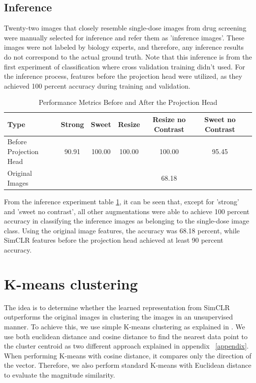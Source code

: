 \subsection{Inference}\label{subsec:inference}

Twenty-two images that closely resemble single-dose images from drug screening were manually selected for inference and refer them as 'inference images'. These images were not labeled by biology experts, and therefore, any inference results do not correspond to the actual ground truth. Note that this inference is from the first experiment of classification where cross validation training didn't used. For the inference process, features before the projection head were utilized, as they achieved 100 percent accuracy during training and validation.
\begin{table}[H]
    \centering
    \begin{tabular}{@{}lcccccc@{}}
    \toprule
    \textbf{Type} & \textbf{Strong} & \textbf{Sweet} & \textbf{Resize} & \textbf{Resize no Contrast} & \textbf{Sweet no Contrast} \\ \midrule
    Before Projection Head & 90.91 & 100.00 & 100.00 & 100.00 & 95.45 \\ \midrule
    Original Images & & & & 68.18 & \\ \bottomrule
    \end{tabular}
    \caption{Performance Metrics Before and After the Projection Head}
    \label{tab:performance_metrics}
\end{table}

From the inference experiment table \ref{tab:performance_metrics}, it can be seen that, except for 'strong' and 'sweet no contrast', all other augmentations were able to achieve 100 percent accuracy in classifying the inference images as belonging to the single-dose image class. Using the original image features, the accuracy was 68.18 percent, while SimCLR features before the projection head achieved at least 90 percent accuracy. 
\section{K-means clustering}

The idea is to determine whether the learned representation from SimCLR outperforms the original images in clustering the images in an unsupervised manner. To achieve this, we use simple K-means clustering as explained in \cite{bishop:2006:PRML}. We use both euclidean distance and cosine distance to find the nearest data point to the cluster centroid as two different approach explained in appendix ~\ref{appendix}. When performing K-means with cosine distance, it compares only the direction of the vector. Therefore, we also perform standard K-means with Euclidean distance to evaluate the magnitude similarity. 
